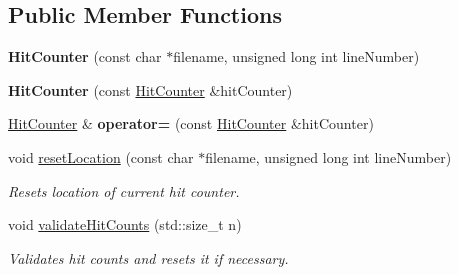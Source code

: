 \subsection*{Public Member Functions}
\begin{DoxyCompactItemize}
\item 
\mbox{\label{classel_1_1base_1_1_hit_counter_a1fe641f45123641012673f8bc29aefd8}} 
{\bfseries Hit\+Counter} (const char $\ast$filename, unsigned long int line\+Number)
\item 
\mbox{\label{classel_1_1base_1_1_hit_counter_abae187cf5ea0f94e812223ee4be7061f}} 
{\bfseries Hit\+Counter} (const \hyperlink{classel_1_1base_1_1_hit_counter}{Hit\+Counter} \&hit\+Counter)
\item 
\mbox{\label{classel_1_1base_1_1_hit_counter_ad32a5e5c2a63ff30fa9d298613d746d1}} 
\hyperlink{classel_1_1base_1_1_hit_counter}{Hit\+Counter} \& {\bfseries operator=} (const \hyperlink{classel_1_1base_1_1_hit_counter}{Hit\+Counter} \&hit\+Counter)
\item 
\mbox{\label{classel_1_1base_1_1_hit_counter_af58479cb66b71a76a3f8fd26193bfde1}} 
void \hyperlink{classel_1_1base_1_1_hit_counter_af58479cb66b71a76a3f8fd26193bfde1}{reset\+Location} (const char $\ast$filename, unsigned long int line\+Number)
\begin{DoxyCompactList}\small\item\em Resets location of current hit counter. \end{DoxyCompactList}\item 
\mbox{\label{classel_1_1base_1_1_hit_counter_a04dcca0a3f1b1f9a0ef8d812f00cecf0}} 
void \hyperlink{classel_1_1base_1_1_hit_counter_a04dcca0a3f1b1f9a0ef8d812f00cecf0}{validate\+Hit\+Counts} (std\+::size\+\_\+t n)
\begin{DoxyCompactList}\small\item\em Validates hit counts and resets it if necessary. \end{DoxyCompactList}\item 
\mbox{\label{classel_1_1base_1_1_hit_counter_a47876995665d4f6389ac150ac8a80b89}} 

\end{DoxyCompactItemize}
